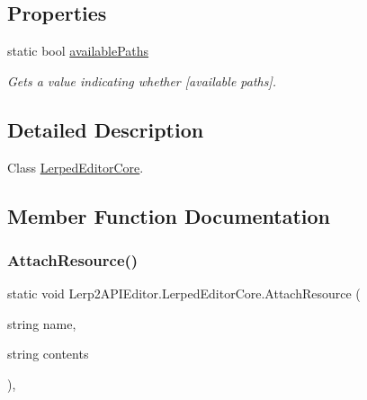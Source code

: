 \subsection*{Properties}
\begin{DoxyCompactItemize}
\item 
static bool \hyperlink{class_lerp2_a_p_i_editor_1_1_lerped_editor_core_ae8f930032b75fb5aeaa237bb45f8ae86}{available\+Paths}
\begin{DoxyCompactList}\small\item\em Gets a value indicating whether \mbox{[}available paths\mbox{]}. \end{DoxyCompactList}\end{DoxyCompactItemize}


\subsection{Detailed Description}
Class \hyperlink{class_lerp2_a_p_i_editor_1_1_lerped_editor_core}{Lerped\+Editor\+Core}. 



\subsection{Member Function Documentation}
\mbox{\label{class_lerp2_a_p_i_editor_1_1_lerped_editor_core_af596bafdf9567527184224681f6f6907}} 
\subsubsection{\texorpdfstring{Attach\+Resource()}{AttachResource()}}
{\footnotesize\ttfamily static void Lerp2\+A\+P\+I\+Editor.\+Lerped\+Editor\+Core.\+Attach\+Resource (\begin{DoxyParamCaption}\item[{string}]{name,  }\item[{string}]{contents }\end{DoxyParamCaption})\hspace{0.3cm}{\ttfamily [inline]}, {\ttfamily [static]}}



